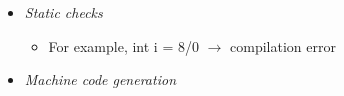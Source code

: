 {\begin{itemize}
\begin{itemize}
\item \textit{Static checks}

\begin{itemize}

\item For example, int i = 8/0 $\rightarrow$ compilation error

\end{itemize}

\item \textit{Machine code generation}

\end{itemize}

\end{itemize}

}